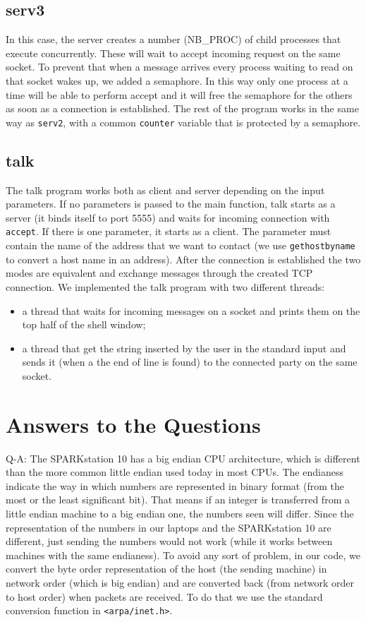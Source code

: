 \subsection{serv3}
In this case, the server creates a number (NB\_PROC) of child processes that execute concurrently. These will wait to accept incoming request on the same socket. To prevent that when a message arrives every process waiting to read on that socket wakes up, we added a semaphore. In this way only one process at a time will be able to perform accept and it will free the semaphore for the others as soon as a connection is established. The rest of the program works in the same way as \texttt{serv2}, with a common \texttt{counter} variable that is protected by a semaphore.

\subsection{talk}
The talk program works both as client and server depending on the input parameters. If no parameters is passed to the main function, talk starts as a server (it binds itself to port 5555) and waits for incoming connection with \texttt{accept}. If there is one parameter, it starts as a client. The parameter must contain the name of the address that we want to contact (we use \texttt{gethostbyname} to convert a host name in an address). After the connection is established the two modes are equivalent and exchange messages through the created TCP connection. 
We implemented the talk program with two different threads:
\begin{itemize}
\item a thread that waits for incoming messages on a socket and prints them on the top half of the shell window;
\item a thread that get the string inserted by the user in the standard input and sends it (when a the end of line is found) to the connected party on the same socket.
\end{itemize}


\section{Answers to the Questions}

Q-A: The SPARKstation 10 has a big endian CPU architecture, which is different than the more common little endian used today in most CPUs. The endianess indicate the way in which numbers are represented in binary format (from the most or the least significant bit). That means if an integer is transferred from a little endian machine to a big endian one, the numbers seen will differ. Since the representation of the numbers in our laptops and the SPARKstation 10 are different, just sending the numbers would not work (while it works between machines with the same endianess). To avoid any sort of problem, in our code, we convert the byte order representation of the host (the sending machine) in network order (which is big endian) and are converted back (from network order to host order) when packets are received. To do that we use the standard conversion function in \texttt{<arpa/inet.h>}.

